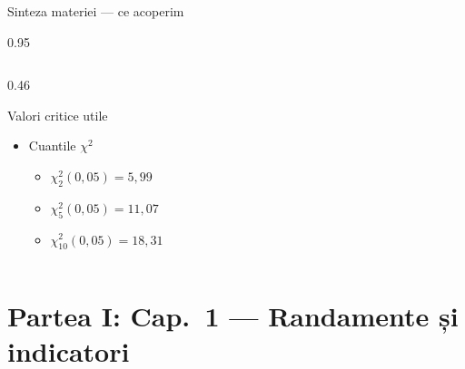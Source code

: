 \documentclass[9pt, aspectratio=169, t]{beamer}
\begin{document}
\begin{frame}[shrink=25]{Sinteza materiei --- ce acoperim}
\begin{cminipage}{0.95\textwidth}
\begin{columns}[T]
\begin{column}{0.46\textwidth}
\begin{alertblock}{Valori critice utile}
\begin{itemize}
    \begin{itemize}\setlength{\itemsep}{0pt}
        \item $z_{0{,}05} = 1{,}645$
        \item $z_{0{,}025} = 1{,}96$
        \item $z_{0{,}01} = 2{,}326$
    \end{itemize}
    \item Cuantile $\chi^2$
    \begin{itemize}\setlength{\itemsep}{0pt}
        \item $\chi^2_2(0{,}05) = 5{,}99$
        \item $\chi^2_5(0{,}05) = 11{,}07$
        \item $\chi^2_{10}(0{,}05) = 18{,}31$
    \end{itemize}
\end{itemize}
\end{alertblock}
\end{column}
\end{columns}
\end{cminipage}
\end{frame}

\section{Partea I: Cap.~1 --- Randamente și indicatori}
\end{document}
